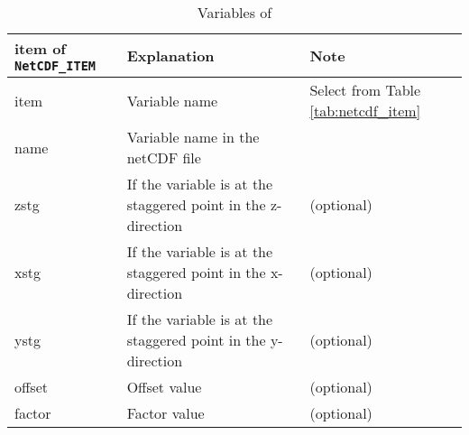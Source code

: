 {\small
\begin{table}[tbh]
\begin{center}
\caption{Variables of }
\label{tab:namelist_netcdf_item}
\begin{tabularx}{150mm}{llX} \hline
\rowcolor[gray]{0.9}
item of \verb|NetCDF_ITEM| & Explanation    & Note \\ \hline
item                      & Variable name  & Select from Table \ref{tab:netcdf_item}   \\ \hline
name                      & Variable name in the netCDF file & \\ \hline
zstg                      & If the variable is at the staggered point in the z-direction & (optional) \\ \hline
xstg                      & If the variable is at the staggered point in the x-direction & (optional) \\ \hline
ystg                      & If the variable is at the staggered point in the y-direction & (optional) \\ \hline
offset                    & Offset value & (optional) \\ \hline
factor                    & Factor value & (optional) \\ \hline
\end{tabularx}
\end{center}
\end{table}
}

